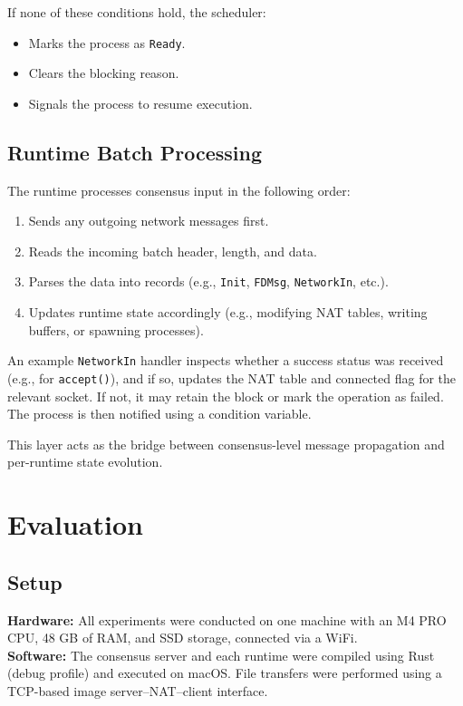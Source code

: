 \documentclass[10pt, 
]{IEEEtran}
\begin{document}
If none of these conditions hold, the scheduler:
\begin{itemize}
\item Marks the process as \texttt{Ready}.
\item Clears the blocking reason.
\item Signals the process to resume execution.
\end{itemize}

\subsection{Runtime Batch Processing}

The runtime processes consensus input in the following order:
\begin{enumerate}
\item Sends any outgoing network messages first.
\item Reads the incoming batch header, length, and data.
\item Parses the data into records (e.g., \texttt{Init}, \texttt{FDMsg}, \texttt{NetworkIn}, etc.).
\item Updates runtime state accordingly (e.g., modifying NAT tables, writing buffers, or spawning processes).
\end{enumerate}

An example \texttt{NetworkIn} handler inspects whether a success status was received (e.g., for \texttt{accept()}), and if so, updates the NAT table and connected flag for the relevant socket. If not, it may retain the block or mark the operation as failed. The process is then notified using a condition variable.

This layer acts as the bridge between consensus-level message propagation and per-runtime state evolution.

\section{Evaluation}

\subsection{Setup}
\textbf{Hardware:} All experiments were conducted on one machine with an M4 PRO CPU, 48 GB of RAM, and SSD storage, connected via a WiFi. \\ 
\textbf{Software:} The consensus server and each runtime were compiled using Rust (debug profile) and executed on macOS. File transfers were performed using a TCP-based image server--NAT--client interface.
\end{document}
